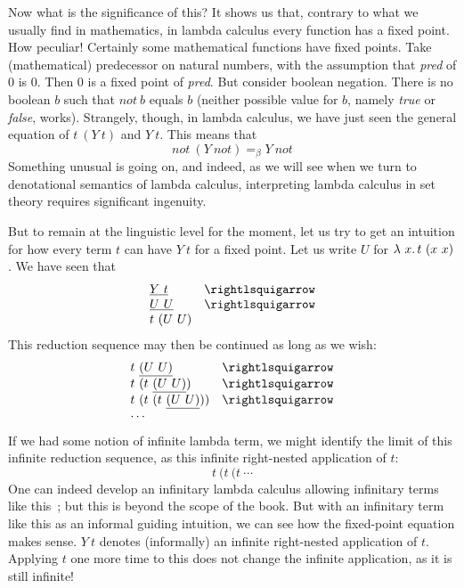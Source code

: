 Now what is the significance of this?  It shows us that, contrary to
what we usually find in mathematics, in lambda calculus every function
has a fixed point.  How peculiar!  Certainly some mathematical
functions have fixed points.  Take (mathematical) predecessor on
natural numbers, with the assumption that \textit{pred} of $0$ is $0$.
Then $0$ is a fixed point of \textit{pred}.  But consider boolean negation.
There is no boolean $b$ such that $\textit{not}\ b$ equals $b$ (neither possible
value for $b$, namely \textit{true} or \textit{false}, works).  Strangely, though,
in lambda calculus, we have just seen the general equation of $t\ (Y\ t)$ and $Y\ t$.
This means that
\[
\textit{not}\ (Y\ \textit{not}) =_\beta Y\ \textit{not}
\]
\noindent Something unusual is going on, and indeed, as we will see when we
turn to denotational semantics of lambda calculus, interpreting lambda calculus
in set theory requires significant ingenuity.

But to remain at the linguistic level for the moment, let us try to get an intuition
for how every term $t$ can have $Y\ t$ for a fixed point.  Let us write $U$ for $\lambda\ x.\, t\ (x\ x)$.  We have seen that
\[
\begin{array}{ll}
  \underline{Y\ t} & \betaa \\
  \underline{U\ U} & \betaa \\
  t\ (U\ U)&\ 
\end{array}
  \]
\noindent  This reduction sequence may then be continued as long as we wish:
\[
\begin{array}{ll}
  t\ \underline{(U\ U)}&\betaa \\
  t\ (t\ \underline{(U\ U)})&\betaa \\  
  t\ (t\ (t\ \underline{(U\ U)}))&\betaa \\
  \multicolumn{2}{l}{\cdots}
\end{array}
\]
\noindent If we had some notion of infinite lambda term, we might identify the limit of this infinite reduction sequence,
as this infinite right-nested application of $t$:
\[
t\ (t\ (t\ \cdots
\]
\noindent One can indeed develop an infinitary lambda calculus
allowing infinitary terms like this~\cite{kennaway1997}; but this is
beyond the scope of the book.  But with an infinitary term like
this as an informal guiding intuition, we can see how the fixed-point equation
makes sense.  $Y\ t$ denotes (informally) an infinite
right-nested application of $t$.  Applying $t$ one more time to this
does not change the infinite application, as it is still infinite!

